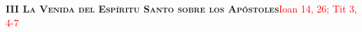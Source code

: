 \noindent\textbf{\textsc{III La Venida del Espíritu Santo sobre los Apóstoles}}\hfill\textcolor{red}{Ioan 14, 26; Tit 3, 4-7}

\vspace{0.25em}


